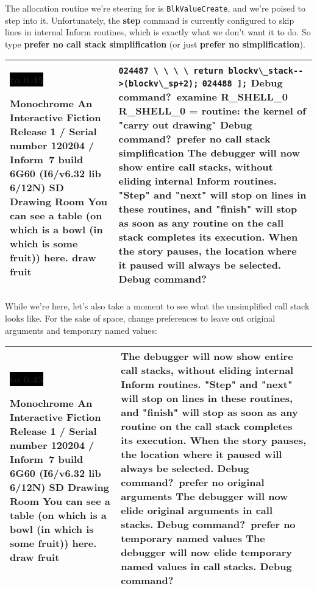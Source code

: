 \documentclass{book}
\newcommand{\n}{\hspace*{\fill}\newline}
\newcommand{\terp}[2]{\begin{center}\begin{tabular}{p{0.45\textwidth}|p{0.45\textwidth}}\midrule #1&#2\\\midrule\end{tabular}\end{center}}
\newcommand{\glkheading}[1]{\textbf{#1}}
\newcommand{\glkinput}[1]{\textbf{#1}}
\newcommand{\glkstatusline}[2]{\centerline{\colorbox{black}{\hbox to 0.45\textwidth{\textcolor{white}{#1\hfil #2}}}}}
\newcommand{\storyprompt}{\raisebox{1.5pt}{\(>\)}}
\newcommand{\cursor}{\raisebox{-1.5pt}{\RectangleThin}}
\newcommand{\unmarkedindent}{\hphantom{\(>\)}\qquad}
\newcommand{\unmarkedindentb}{\qquad\hphantom{\(>\)}}
\begin{document}
The allocation routine we're steering for is \lstinline{BlkValueCreate}, and
we're poised to step into it.  Unfortunately, the \glkinput{step} command is
currently configured to skip lines in internal Inform routines, which is exactly
what we don't want it to do.  So type \glkinput{prefer no call stack
  simplification} (or just \glkinput{prefer no simplification}).

\terp{\glkstatusline{Drawing Room}{0/1}\n
  \glkheading{Monochrome}\n
  An Interactive Fiction\n
  Release 1 / Serial number 120204 / Inform~7 build 6G60 (I6/v6.32 lib 6/12N) SD\n
  \n
  \glkheading{Drawing Room}\n
  You can see a table (on which is a bowl (in which is some fruit)) here.\n
  \n
  \storyprompt\glkinput{draw fruit}}{%
  \unmarkedindentb \lstinline{024487 \ \ \ \ return blockv\_stack-->(blockv\_sp+2);}\n
  \unmarkedindent \lstinline{024488 ];}\n
  \n
  Debug command?\ \glkinput{examine R\_SHELL\_0}\n
  \n
  R\_SHELL\_0 = routine: the kernel of "carry out drawing"\n
  \n
  Debug command?\ \glkinput{prefer no call stack simplification}\n
  \n
  The debugger will now show entire call stacks, without eliding internal Inform routines.  "Step" and "next" will stop on lines in these routines, and "finish" will stop as soon as any routine on the call stack completes its execution.  When the story pauses, the location where it paused will always be selected.\n
  \n
  Debug command?\ \cursor}

While we're here, let's also take a moment to see what the unsimplified call
stack looks like.  For the sake of space, change preferences to leave out
original arguments and temporary named values:

\terp{\glkstatusline{Drawing Room}{0/1}\n
  \glkheading{Monochrome}\n
  An Interactive Fiction\n
  Release 1 / Serial number 120204 / Inform~7 build 6G60 (I6/v6.32 lib 6/12N) SD\n
  \n
  \glkheading{Drawing Room}\n
  You can see a table (on which is a bowl (in which is some fruit)) here.\n
  \n
  \storyprompt\glkinput{draw fruit}}{%
  The debugger will now show entire call stacks, without eliding internal Inform routines.  "Step" and "next" will stop on lines in these routines, and "finish" will stop as soon as any routine on the call stack completes its execution.  When the story pauses, the location where it paused will always be selected.\n
  \n
  Debug command?\ \glkinput{prefer no original arguments}\n
  \n
  The debugger will now elide original arguments in call stacks.\n
  \n
  Debug command?\ \glkinput{prefer no temporary named values}\n
  \n
  The debugger will now elide temporary named values in call stacks.\n
  \n
  Debug command?\ \cursor}
\end{document}
